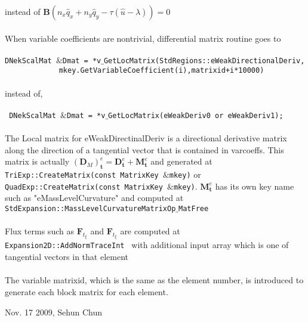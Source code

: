 \documentclass{elsart}
\begin{document}
instead of $ 
\mathbf{B} \left (n_x \hat{q}_x +  n_y \hat{q}_y- \tau ( \hat{u} - \lambda ) \right ) = 0
$
\\
\\
When variable coefficients are nontrivial, differential matrix routine goes to \\
\\
                           \texttt{DNekScalMat $\&$Dmat = *v$\_$GetLocMatrix(StdRegions::eWeakDirectionalDeriv, \\
                          $~~~~~~~~~~~~~~~~~~~~~~~~~~~$ mkey.GetVariableCoefficient(i),matrixid+i*10000) }\\
\\
instead of, \\
\\
             \texttt{       DNekScalMat $\&$Dmat = *v$\_$GetLocMatrix(eWeakDeriv0 or eWeakDeriv1);} \\
\\
The Local matrix for eWeakDirectinalDeriv is a directional derivative matrix along the direction of a tangential vector that is contained in varcoeffs. This matrix is actually  $\left ( \mathbf{D}_{\mathit{M}} \right )_{\mathbf{t}}^e = \mathbf{D}_{\mathbf{t}}^e + \mathbf{M}_{\mathbf{t}}^e$ and 
generated at \texttt{TriExp::CreateMatrix(const MatrixKey $\&$mkey)} or \texttt{QuadExp::CreateMatrix(const MatrixKey $\&$mkey)}. $\mathbf{M}_{\mathbf{t}}^e$ has its own key name such as "eMassLevelCurvature" and computed at \texttt{StdExpansion::MassLevelCurvatureMatrixOp$\_$MatFree} \\
\\
Flux terms such as $\mathbf{F}_{t_{\xi}}$ and $\mathbf{F}_{t_{\xi}}$ are computed at \texttt{ Expansion2D::AddNormTraceInt } with additional input array which is one of tangential vectors in that element\\
\\
The variable matrixid, which is the same as the element number, is introduced to generate each block matrix for each element.

\vspace{3cm}

Nov. 17 2009, Sehun Chun


\end{document}
